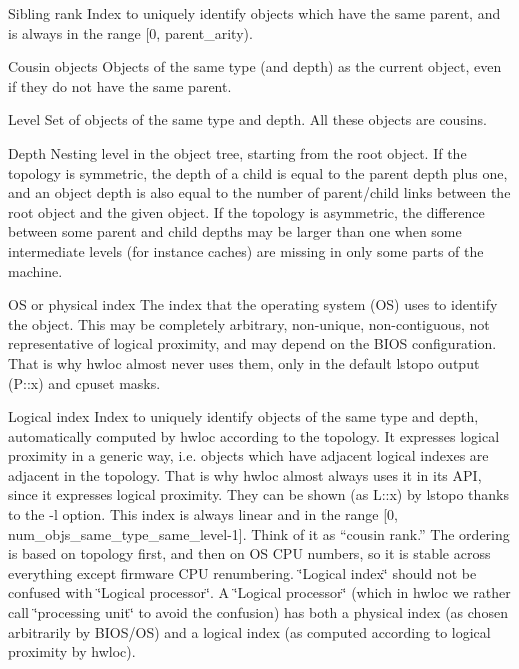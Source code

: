 \begin{DoxyDescription}
\item[Sibling rank ]Index to uniquely identify objects which have the same parent, and is always in the range \mbox{[}0, parent\_\-arity).


\item[Cousin objects ]Objects of the same type (and depth) as the current object, even if they do not have the same parent.


\item[Level ]Set of objects of the same type and depth. All these objects are cousins.


\item[Depth ]Nesting level in the object tree, starting from the root object. If the topology is symmetric, the depth of a child is equal to the parent depth plus one, and an object depth is also equal to the number of parent/child links between the root object and the given object. If the topology is asymmetric, the difference between some parent and child depths may be larger than one when some intermediate levels (for instance caches) are missing in only some parts of the machine. 


\item[OS or physical index ]The index that the operating system (OS) uses to identify the object. This may be completely arbitrary, non-\/unique, non-\/contiguous, not representative of logical proximity, and may depend on the BIOS configuration. That is why hwloc almost never uses them, only in the default lstopo output ({\ttfamily P::x}) and cpuset masks.


\item[Logical index ]Index to uniquely identify objects of the same type and depth, automatically computed by hwloc according to the topology. It expresses logical proximity in a generic way, i.e. objects which have adjacent logical indexes are adjacent in the topology. That is why hwloc almost always uses it in its API, since it expresses logical proximity. They can be shown (as {\ttfamily L::x}) by {\ttfamily lstopo} thanks to the {\ttfamily -\/l} option. This index is always linear and in the range \mbox{[}0, num\_\-objs\_\-same\_\-type\_\-same\_\-level-\/1\mbox{]}. Think of it as ``cousin rank.'' The ordering is based on topology first, and then on OS CPU numbers, so it is stable across everything except firmware CPU renumbering. \char`\"{}Logical index\char`\"{} should not be confused with \char`\"{}Logical processor\char`\"{}. A \char`\"{}Logical
  processor\char`\"{} (which in hwloc we rather call \char`\"{}processing unit\char`\"{} to avoid the confusion) has both a physical index (as chosen arbitrarily by BIOS/OS) and a logical index (as computed according to logical proximity by hwloc). 



\end{DoxyDescription}
